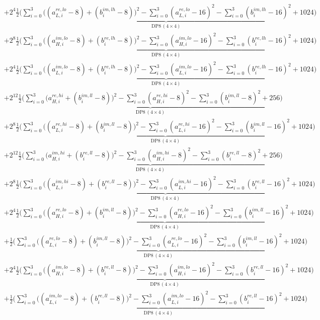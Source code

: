 \documentclass[fleqn]{article}
\newcommand{\DPop}[3]{\mathrm{DP#1}\,(#2\!\times\!#3)}
\begin{document}
\begin{align*}
  & + 2^{4}\underbrace{\tfrac12\Big(\sum_{i=0}^{3}\big((a_{L,i}^{re,lo}{-}8){+}(b_i^{im,lh}{-}8)\big)^2 - \sum_{i=0}^{3}(a_{L,i}^{re,lo}{-}16)^2 - \sum_{i=0}^{3}(b_i^{im,lh}{-}16)^2 + 1024\Big)}_{\DPop{8}{4}{4}} \\[0.35em]
  & + 2^{8}\underbrace{\tfrac12\Big(\sum_{i=0}^{3}\big((a_{H,i}^{im,lo}{-}8){+}(b_i^{re,lh}{-}8)\big)^2 - \sum_{i=0}^{3}(a_{H,i}^{im,lo}{-}16)^2 - \sum_{i=0}^{3}(b_i^{re,lh}{-}16)^2 + 1024\Big)}_{\DPop{8}{4}{4}} \\[0.35em]
  & + 2^{4}\underbrace{\tfrac12\Big(\sum_{i=0}^{3}\big((a_{L,i}^{im,lo}{-}8){+}(b_i^{re,lh}{-}8)\big)^2 - \sum_{i=0}^{3}(a_{L,i}^{im,lo}{-}16)^2 - \sum_{i=0}^{3}(b_i^{re,lh}{-}16)^2 + 1024\Big)}_{\DPop{8}{4}{4}} \\[0.35em]
  & + 2^{12}\underbrace{\tfrac12\Big(\sum_{i=0}^{3}\big(a_{H,i}^{re,hi}{+}(b_i^{im,ll}{-}8)\big)^2 - \sum_{i=0}^{3}(a_{H,i}^{re,hi}{-}8)^2 - \sum_{i=0}^{3}(b_i^{im,ll}{-}8)^2 + 256\Big)}_{\DPop{8}{4}{4}} \\[0.35em]
  & + 2^{8}\underbrace{\tfrac12\Big(\sum_{i=0}^{3}\big((a_{L,i}^{re,hi}{-}8){+}(b_i^{im,ll}{-}8)\big)^2 - \sum_{i=0}^{3}(a_{L,i}^{re,hi}{-}16)^2 - \sum_{i=0}^{3}(b_i^{im,ll}{-}16)^2 + 1024\Big)}_{\DPop{8}{4}{4}} \\[0.35em]
  & + 2^{12}\underbrace{\tfrac12\Big(\sum_{i=0}^{3}\big(a_{H,i}^{im,hi}{+}(b_i^{re,ll}{-}8)\big)^2 - \sum_{i=0}^{3}(a_{H,i}^{im,hi}{-}8)^2 - \sum_{i=0}^{3}(b_i^{re,ll}{-}8)^2 + 256\Big)}_{\DPop{8}{4}{4}} \\[0.35em]
  & + 2^{8}\underbrace{\tfrac12\Big(\sum_{i=0}^{3}\big((a_{L,i}^{im,hi}{-}8){+}(b_i^{re,ll}{-}8)\big)^2 - \sum_{i=0}^{3}(a_{L,i}^{im,hi}{-}16)^2 - \sum_{i=0}^{3}(b_i^{re,ll}{-}16)^2 + 1024\Big)}_{\DPop{8}{4}{4}} \\[0.35em]
  & + 2^{4}\underbrace{\tfrac12\Big(\sum_{i=0}^{3}\big((a_{H,i}^{re,lo}{-}8){+}(b_i^{im,ll}{-}8)\big)^2 - \sum_{i=0}^{3}(a_{H,i}^{re,lo}{-}16)^2 - \sum_{i=0}^{3}(b_i^{im,ll}{-}16)^2 + 1024\Big)}_{\DPop{8}{4}{4}} \\[0.35em]
  & + \underbrace{\tfrac12\Big(\sum_{i=0}^{3}\big((a_{L,i}^{re,lo}{-}8){+}(b_i^{im,ll}{-}8)\big)^2 - \sum_{i=0}^{3}(a_{L,i}^{re,lo}{-}16)^2 - \sum_{i=0}^{3}(b_i^{im,ll}{-}16)^2 + 1024\Big)}_{\DPop{8}{4}{4}} \\[0.35em]
  & + 2^{4}\underbrace{\tfrac12\Big(\sum_{i=0}^{3}\big((a_{H,i}^{im,lo}{-}8){+}(b_i^{re,ll}{-}8)\big)^2 - \sum_{i=0}^{3}(a_{H,i}^{im,lo}{-}16)^2 - \sum_{i=0}^{3}(b_i^{re,ll}{-}16)^2 + 1024\Big)}_{\DPop{8}{4}{4}} \\[0.35em]
  & + \underbrace{\tfrac12\Big(\sum_{i=0}^{3}\big((a_{L,i}^{im,lo}{-}8){+}(b_i^{re,ll}{-}8)\big)^2 - \sum_{i=0}^{3}(a_{L,i}^{im,lo}{-}16)^2 - \sum_{i=0}^{3}(b_i^{re,ll}{-}16)^2 + 1024\Big)}_{\DPop{8}{4}{4}}
\end{align*}
\end{document}
